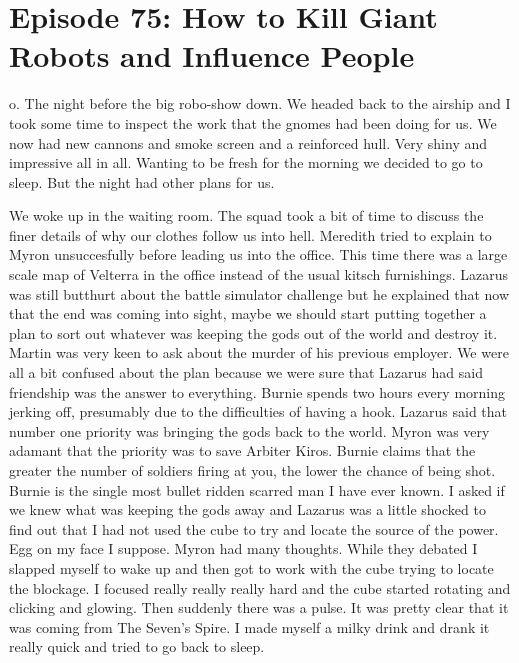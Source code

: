 \section{Episode 75: How to Kill Giant Robots and Influence People}

\medskip

o. The night before the big robo-show down. We headed back to the airship and I took some time to inspect the work that the gnomes had been doing for us. We now had new cannons and smoke screen and a reinforced hull. Very shiny and impressive all in all. Wanting to be fresh for the morning we decided to go to sleep. But the night had other plans for us.\medskip

We woke up in the waiting room. The squad took a bit of time to discuss the finer details of why our clothes follow us into hell. Meredith tried to explain to Myron unsuccesfully before leading us into the office. This time there was a large scale map of Velterra in the office instead of the usual kitsch furnishings. Lazarus was still butthurt about the battle simulator challenge but he explained that now that the end was coming into sight, maybe we should start putting together a plan to sort out whatever was keeping the gods out of the world and destroy it. Martin was very keen to ask about the murder of his previous employer. We were all a bit confused about the plan because we were sure that Lazarus had said friendship was the answer to everything. Burnie spends two hours every morning jerking off, presumably due to the difficulties of having a hook. Lazarus said that number one priority was bringing the gods back to the world. Myron was very adamant that the priority was to save Arbiter Kiros. Burnie claims that the greater the number of soldiers firing at you, the lower the chance of being shot. Burnie is the single most bullet ridden scarred man I have ever known. I asked if we knew what was keeping the gods away and Lazarus was a little shocked to find out that I had not used the cube to try and locate the source of the power. Egg on my face I suppose. Myron had many thoughts. While they debated I slapped myself to wake up and then got to work with the cube trying to locate the blockage. I focused really really really hard and the cube started rotating and clicking and glowing. Then suddenly there was a pulse. It was pretty clear that it was coming from The Seven’s Spire. I made myself a milky drink and drank it really quick and tried to go back to sleep.\medskip

